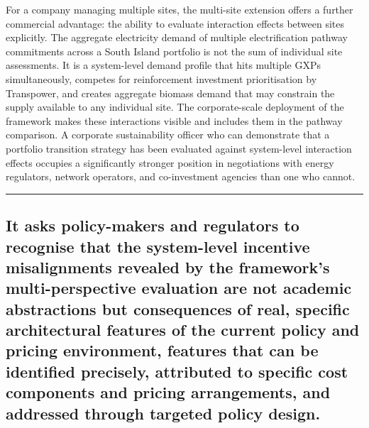 \documentclass[
  11pt,
  a4paper,
  twoside,
  openright]{scrbook}
\begin{document}
For a company managing multiple sites, the multi-site extension offers a
further commercial advantage: the ability to evaluate interaction
effects between sites explicitly. The aggregate electricity demand of
multiple electrification pathway commitments across a South Island
portfolio is not the sum of individual site assessments. It is a
system-level demand profile that hits multiple GXPs simultaneously,
competes for reinforcement investment prioritisation by Transpower, and
creates aggregate biomass demand that may constrain the supply available
to any individual site. The corporate-scale deployment of the framework
makes these interactions visible and includes them in the pathway
comparison. A corporate sustainability officer who can demonstrate that
a portfolio transition strategy has been evaluated against system-level
interaction effects occupies a significantly stronger position in
negotiations with energy regulators, network operators, and
co-investment agencies than one who cannot.

\begin{center}\rule{0.5\linewidth}{0.5pt}\end{center}

\subsection{It asks policy-makers and regulators to recognise that the
system-level incentive misalignments revealed by the framework's
multi-perspective evaluation are not academic abstractions but
consequences of real, specific architectural features of the current
policy and pricing environment, features that can be identified
precisely, attributed to specific cost components and pricing
arrangements, and addressed through targeted policy
design.}\label{it-asks-policy-makers-and-regulators-to-recognise-that-the-system-level-incentive-misalignments-revealed-by-the-frameworks-multi-perspective-evaluation-are-not-academic-abstractions-but-consequences-of-real-specific-architectural-features-of-the-current-policy-and-pricing-environment-features-that-can-be-identified-precisely-attributed-to-specific-cost-components-and-pricing-arrangements-and-addressed-through-targeted-policy-design.}
\end{document}
